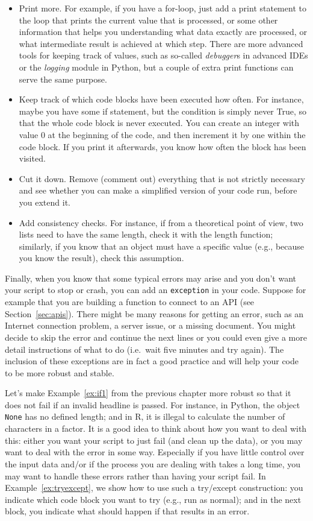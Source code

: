 \begin{itemize}
  \item Print more. For example, if you have a for-loop, just add a print statement to the loop that prints the current value that is processed, or some other information that helps you understanding what data exactly are processed, or what intermediate result is achieved at which step. There are more advanced tools for keeping track of values, such as so-called \emph{debugger}s in advanced IDEs or the \emph{logging} module in Python, but a couple of extra print functions can serve the same purpose.
  \item Keep track of which code blocks have been executed how often. For instance, maybe you have some if statement, but the condition is simply never True, so that the whole code block is never executed. You can create an integer with value 0 at the beginning of the code, and then increment it by one within the code block. If you print it afterwards, you know how often the block has been visited.
  \item Cut it down. Remove (comment out) everything that is not strictly necessary and see whether you can make a simplified version of your code run, before you extend it.
  \item Add consistency checks. For instance, if from a theoretical point of view, two lists need to have the same length, check it with the length function; similarly, if you know that an object must have a specific value (e.g., because you know the result), check this assumption.
\end{itemize}


Finally, when you know that some typical errors may arise and you don't want your script to stop or crash, you can add an \texttt{exception} in your code. Suppose for example that you are building a function to connect to an API (see Section~\ref{sec:apis}). There might be many reasons for getting an error, such as an Internet connection problem, a server issue, or a missing document. You might decide to skip  the error and continue the next lines or  you could even give a more detail instructions of what to do (i.e.\ wait five minutes and try again). The inclusion of these exceptions are in fact a good practice and will help your code to be more robust and stable.

Let's make Example~\ref{ex:if1} from the previous chapter more robust so that it does not fail if an invalid headline is passed. For instance, in Python, the object \verb|None| has no defined length; and in R, it is illegal to calculate the number of characters in a factor. It is a good idea to think about how you want to deal with this: either you want your script to just fail (and clean up the data), or you may want to deal with the error in some way. Especially if you have little control over the input data and/or if the process you are dealing with takes a long time, you may want to  handle these errors rather than having your script fail. In Example~\ref{ex:tryexcept}, we show how to use such a try/except construction: you indicate which code block you want to try (e.g., run as normal); and in the next block, you indicate what should happen if that results in an error.


